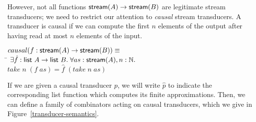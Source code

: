 \documentclass[preprint,natbib]{sigplanconf}
\begin{document}
However, not all functions $\mbox{\textsf{{stream}}}({A}) \to \mbox{\textsf{{stream}}}({B})$ are legitimate
stream transducers; we need to restrict our attention to \emph{causal}
stream transducers. A transducer is causal if we can compute the first
$n$ elements of the output after having read at most $n$ elements of
the input. 

\begin{tabbing}
$causal(f : \mbox{\textsf{{stream}}}({A}) \to \mbox{\textsf{{stream}}}({B})) \equiv$ \\
\;\;\= $\exists \hat{f} : \mbox{\textsf{{list }}}{A} \to \mbox{\textsf{{list }}}{B}.\;\forall as:\mbox{\textsf{{stream}}}({A}), n:\mathbb{N}.$ \\
    \> \;\;$take\;n\;(f\;as) = \hat{f}\;(take\;n\;as)$ 
\end{tabbing}

If we are given a causal transducer $p$, we will write $\hat{p}$ to
indicate the corresponding list function which computes its finite
approximations. Then, we can define a family of combinators acting on
causal transducers, which we give in Figure~\ref{transducer-semantics}.
\end{document}
